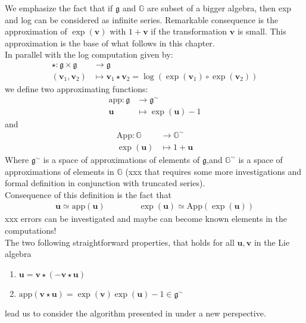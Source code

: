 \noindent
We emphasize the fact that if $\mathfrak{g}$ and $\mathbb{G}$ are subset of a bigger algebra, then exp and log can be considered as infinite series.
Remarkable consequence is the approximation of $\exp(\mathbf{v})$ with $1 + \mathbf{v}$ if the transformation $\mathbf{v}$ is small. This approximation is the base of what follows in this chapter.\\
In parallel with the log computation given by:
\begin{align*}
\star : \mathfrak{g} \times \mathfrak{g} & \longrightarrow \mathfrak{g}    \\
(\mathbf{v}_{1}, \mathbf{v}_{2}) &\longmapsto \mathbf{v}_{1}\star \mathbf{v}_{2} =  \log(\exp(\mathbf{v}_1)\circ \exp(\mathbf{v}_2))
\end{align*}
we define two approximating functions:
\begin{align*}
\text{app} : \mathfrak{g} & \longrightarrow  \mathfrak{g} ^{\sim}    \\
\mathbf{u} &\longmapsto \exp(\mathbf{u}) - 1
\end{align*}
and
\begin{align*}
\text{App} : \mathbb{G} & \longrightarrow  \mathbb{G}^{\sim}   \\
\exp(\mathbf{u}) &\longmapsto 1 + \mathbf{u}
\end{align*}
Where $\mathfrak{g} ^{\sim}$ is a space of approximations of elements of $\mathfrak{g} $,and $\mathbb{G}^{\sim} $ is a space of approximations of elements in $\mathbb{G}$ (xxx that requires some more investigations and formal definition in conjunction with truncated series).\\
Consequence of this definition is the fact that
\begin{align*}
\mathbf{u} \simeq   \text{app} (\mathbf{u})
\qquad \qquad 
\exp(\mathbf{u}) \simeq   \text{App} (\exp(\mathbf{u})) 
\end{align*}
xxx errors can be investigated and maybe can become known elements in the computations! \\
The two following straightforward properties, that holds for all $\mathbf{u}, \mathbf{v} $ in the Lie algebra
\begin{enumerate}
	\item $\mathbf{u} = \mathbf{v} \star  (-\mathbf{v} \star  \mathbf{u} )$
	\item $\text{app} (\mathbf{v} \star  \mathbf{u}) = \exp(\mathbf{v})\exp(\mathbf{u}) - 1 \in \mathfrak{g} ^{\sim}$
\end{enumerate}
lead us to consider the algorithm presented in \cite{Bossa:08} under a new perspective. 


